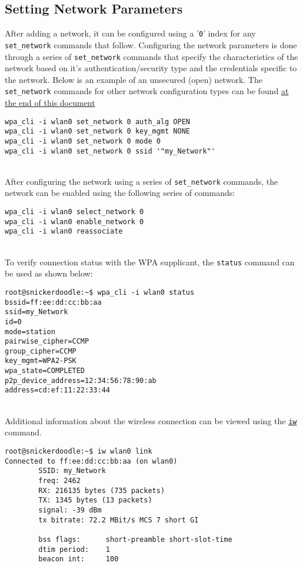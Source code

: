 \subsection{Setting Network Parameters}
After adding a network, it can be configured using a '\texttt{0}' index for any \texttt{set\_network} commands that follow. Configuring the network parameters is done through a series of \texttt{set\_network} commands that specify the characteristics of the network based on it's authentication/security type and the credentials specific to the network. Below is an example of an unsecured (open) network. The \texttt{set\_network} commands for other network configuration types can be found \hyperref[sec:wpacliconfigs]{at the end of this document}\\

\begin{lstlisting}[style=text]
wpa_cli -i wlan0 set_network 0 auth_alg OPEN
wpa_cli -i wlan0 set_network 0 key_mgmt NONE
wpa_cli -i wlan0 set_network 0 mode 0
wpa_cli -i wlan0 set_network 0 ssid '"my_Network"'
\end{lstlisting}


~\\
After configuring the network using a series of \texttt{set\_network} commands, the network can be enabled using the following series of commands: \\

\begin{lstlisting}
wpa_cli -i wlan0 select_network 0
wpa_cli -i wlan0 enable_network 0
wpa_cli -i wlan0 reassociate
\end{lstlisting}

~\\
\noindent
To verify connection status with the WPA supplicant, the \texttt{status} command can be used as shown below: \\

\begin{lstlisting}
root@snickerdoodle:~$ wpa_cli -i wlan0 status
bssid=ff:ee:dd:cc:bb:aa
ssid=my_Network
id=0
mode=station
pairwise_cipher=CCMP
group_cipher=CCMP
key_mgmt=WPA2-PSK
wpa_state=COMPLETED
p2p_device_address=12:34:56:78:90:ab
address=cd:ef:11:22:33:44
\end{lstlisting}


~\\
\noindent
Additional information about the wireless connection can be viewed using the \href{http://linux.die.net/man/8/iw}{\texttt{iw}} command. \\
\begin{lstlisting}[style=text]
root@snickerdoodle:~$ iw wlan0 link
Connected to ff:ee:dd:cc:bb:aa (on wlan0)
        SSID: my_Network
        freq: 2462
        RX: 216135 bytes (735 packets)
        TX: 1345 bytes (13 packets)
        signal: -39 dBm
        tx bitrate: 72.2 MBit/s MCS 7 short GI

        bss flags:      short-preamble short-slot-time
        dtim period:    1
        beacon int:     100
\end{lstlisting}

